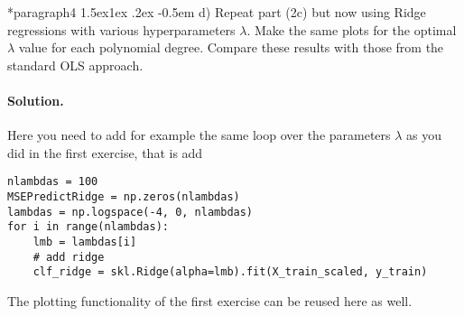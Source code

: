 \documentclass[%
oneside,                 %
final,                   %
10pt]{article}
\makeatletter
\newenvironment{doconceexercise}{}{}
\newcommand\subex{\@startsection*{paragraph}{4}{\z@}%
                  {1.5ex\@plus1ex \@minus.2ex}%
                  {-0.5em}%
                  {\normalfont\normalsize\bfseries}}
\makeatother
\begin{document}
\begin{doconceexercise}
\subex{d)}
Repeat part (2c) but now using Ridge regressions with various hyperparameters $\lambda$. Make the same plots for the optimal $\lambda$ value for each polynomial degree. Compare these results with those from the standard OLS approach.


\paragraph{Solution.}
Here you need to add for example the same loop over the parameters $\lambda$ as you did in the first exercise, that is add
\begin{verbatim}
nlambdas = 100
MSEPredictRidge = np.zeros(nlambdas)
lambdas = np.logspace(-4, 0, nlambdas)
for i in range(nlambdas):
    lmb = lambdas[i]
    # add ridge
    clf_ridge = skl.Ridge(alpha=lmb).fit(X_train_scaled, y_train)

\end{verbatim}
The plotting functionality of the first exercise can be reused here as well.





















\end{doconceexercise}


\end{document}
